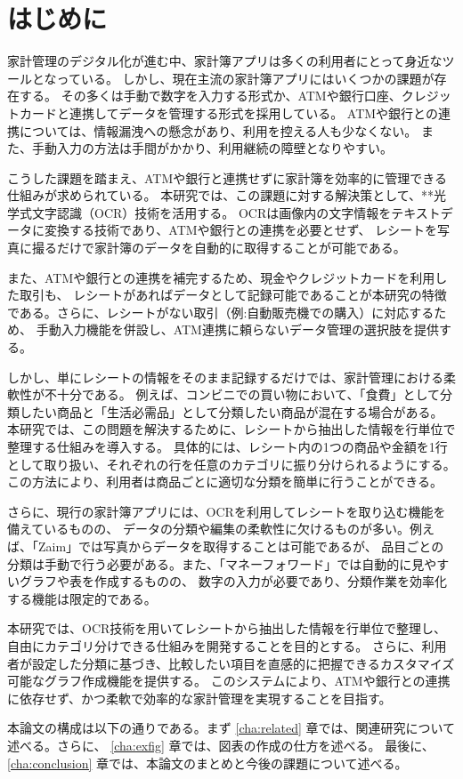 \documentclass[main]{subfiles}
\begin{document}
\chapter{はじめに}
\label{cha:intro}

家計管理のデジタル化が進む中、家計簿アプリは多くの利用者にとって身近なツールとなっている。
しかし、現在主流の家計簿アプリにはいくつかの課題が存在する。
その多くは手動で数字を入力する形式か、ATMや銀行口座、クレジットカードと連携してデータを管理する形式を採用している。
ATMや銀行との連携については、情報漏洩への懸念があり、利用を控える人も少なくない。
また、手動入力の方法は手間がかかり、利用継続の障壁となりやすい。

こうした課題を踏まえ、ATMや銀行と連携せずに家計簿を効率的に管理できる仕組みが求められている。
本研究では、この課題に対する解決策として、**光学式文字認識（OCR）技術を活用する。
OCRは画像内の文字情報をテキストデータに変換する技術であり、ATMや銀行との連携を必要とせず、
レシートを写真に撮るだけで家計簿のデータを自動的に取得することが可能である。

また、ATMや銀行との連携を補完するため、現金やクレジットカードを利用した取引も、
レシートがあればデータとして記録可能であることが本研究の特徴である。さらに、レシートがない取引（例:自動販売機での購入）に対応するため、
手動入力機能を併設し、ATM連携に頼らないデータ管理の選択肢を提供する。

しかし、単にレシートの情報をそのまま記録するだけでは、家計管理における柔軟性が不十分である。
例えば、コンビニでの買い物において、「食費」として分類したい商品と「生活必需品」として分類したい商品が混在する場合がある。
本研究では、この問題を解決するために、レシートから抽出した情報を行単位で整理する仕組みを導入する。
具体的には、レシート内の1つの商品や金額を1行として取り扱い、それぞれの行を任意のカテゴリに振り分けられるようにする。
この方法により、利用者は商品ごとに適切な分類を簡単に行うことができる。

さらに、現行の家計簿アプリには、OCRを利用してレシートを取り込む機能を備えているものの、
データの分類や編集の柔軟性に欠けるものが多い。例えば、「Zaim」では写真からデータを取得することは可能であるが、
品目ごとの分類は手動で行う必要がある。また、「マネーフォワード」では自動的に見やすいグラフや表を作成するものの、
数字の入力が必要であり、分類作業を効率化する機能は限定的である。

本研究では、OCR技術を用いてレシートから抽出した情報を行単位で整理し、自由にカテゴリ分けできる仕組みを開発することを目的とする。
さらに、利用者が設定した分類に基づき、比較したい項目を直感的に把握できるカスタマイズ可能なグラフ作成機能を提供する。
このシステムにより、ATMや銀行との連携に依存せず、かつ柔軟で効率的な家計管理を実現することを目指す。

本論文の構成は以下の通りである。まず \ref{cha:related} 章では、関連研究について述べる。さらに、
\ref{cha:exfig} 章では、図表の作成の仕方を述べる。
最後に、\ref{cha:conclusion} 章では、本論文のまとめと今後の課題について述べる。
\end{document}
